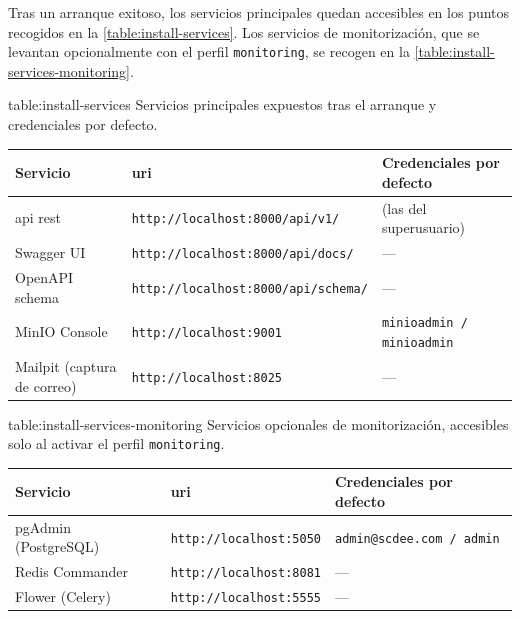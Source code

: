 Tras un arranque exitoso, los servicios principales quedan accesibles en
los puntos recogidos en la \cref{table:install-services}. Los servicios
de monitorización, que se levantan opcionalmente con el perfil
\texttt{monitoring}, se recogen en la
\cref{table:install-services-monitoring}.

\begin{table}[Servicios principales expuestos tras el arranque]%
            {table:install-services}%
            {Servicios principales expuestos tras el arranque y
             credenciales por defecto.}
  \small
  \renewcommand{\arraystretch}{1.3}
  \begin{tabular}{l l l}
    \hline
    \textbf{Servicio} & \textbf{\acs{uri}} & \textbf{Credenciales por defecto} \\
    \hline
    \acs{api} \acs{rest}      & \texttt{http://localhost:8000/api/v1/} & (las del superusuario) \\
    Swagger UI                & \texttt{http://localhost:8000/api/docs/} & --- \\
    OpenAPI schema            & \texttt{http://localhost:8000/api/schema/} & --- \\
    MinIO Console             & \texttt{http://localhost:9001} & \texttt{minioadmin / minioadmin} \\
    Mailpit (captura de correo) & \texttt{http://localhost:8025} & --- \\
    \hline
  \end{tabular}
\end{table}

\begin{table}[Servicios de monitorización (perfil \texttt{monitoring})]%
            {table:install-services-monitoring}%
            {Servicios opcionales de monitorización, accesibles solo al
             activar el perfil \texttt{monitoring}.}
  \small
  \renewcommand{\arraystretch}{1.3}
  \begin{tabular}{l l l}
    \hline
    \textbf{Servicio} & \textbf{\acs{uri}} & \textbf{Credenciales por defecto} \\
    \hline
    pgAdmin (PostgreSQL)      & \texttt{http://localhost:5050} & \texttt{admin@scdee.com / admin} \\
    Redis Commander           & \texttt{http://localhost:8081} & --- \\
    Flower (Celery)           & \texttt{http://localhost:5555} & --- \\
    \hline
  \end{tabular}
\end{table}

